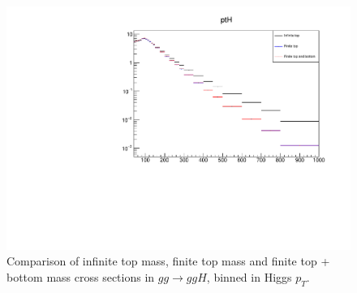 \begin{figure}[H]
\centering
\includegraphics[scale=0.7]{Images/ptH_gg.pdf}
\caption{Comparison of infinite top mass, finite top mass and finite top + bottom mass cross sections in $gg \to ggH$, binned in Higgs $p_T$. }
\label{fig:pth_gg}
\end{figure}


